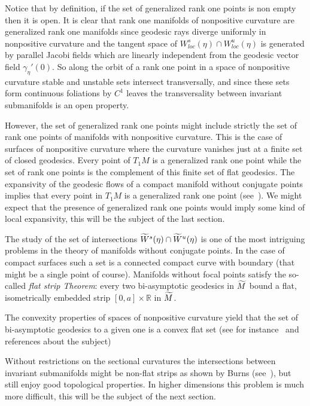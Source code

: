 \documentclass[10pt]{amsart}
\theoremstyle{definition}
\newcommand{\bbR}{\mathbb{R}}
\let\oldtilde\tilde
\renewcommand*{\tilde}[1]{\mathchoice{\widetilde{#1}}{\widetilde{#1}}{\oldtilde{#1}}{\oldtilde{#1}}}
\begin{document}
Notice that by definition, if the set of generalized rank one points is non empty then it is open. It is clear that rank one manifolds of nonpositive curvature are generalized rank one manifolds since geodesic rays diverge uniformly in nonpositive curvature and the tangent space of $ W^{s}_{loc}(\eta) \cap W^{u}_{loc}(\eta)$ is generated by parallel Jacobi fields which are linearly independent from the geodesic vector field $\gamma_{\eta}'(0)$. So along the orbit of a rank one point in a space of nonpositive curvature stable and unstable sets intersect transversally, and since these sets form continuous foliations by $C^{1}$ leaves the transversality between invariant submanifolds is an open property.

However, the set of generalized rank one points might include strictly the set of rank one points of manifolds with nonpositive curvature. This is the case of surfaces of nonpositive curvature where the curvature vanishes just at a finite set of closed geodesics. Every point of $T_{1}M$ is a generalized rank one point while the set of rank one points is the complement of this finite set of flat geodesics. The expansivity of the geodesic flows of a compact manifold without conjugate points implies that every point in $T_{1}M$ is a generalized rank one point (see~\cite{kn:Ruggiero-expansive}). We might expect that the presence of generalized rank one points would imply some kind of local expansivity, this will be the subject of the last section.

The study of the set of intersections $\tilde{W}^{s}(\eta) \cap \tilde{W}^{u}(\eta)$ is one of the most intriguing problems in the theory of manifolds without conjugate points. In the case of compact surfaces such a set is a connected compact curve with boundary (that might be a single point of course). Manifolds without focal points satisfy the so-called \emph{flat strip Theorem}: every two bi-asymptotic geodesics in $\tilde{M}$ bound a flat, isometrically embedded strip $[0,a]\times \bbR$ in $\tilde{M}$.

The convexity properties of spaces of nonpositive curvature yield that the set of bi-asymptotic geodesics to a given one is a convex flat set (see for instance~\cite{kn:BGS} and references about the subject)

Without restrictions on the sectional curvatures the intersections between invariant submanifolds might be non-flat strips as shown by Burns (see~\cite{kn:Burns}), but still enjoy good topological properties. In higher dimensions this problem is much more difficult, this will be the subject of the next section.
\end{document}

